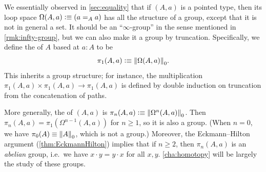 \begin{eg}\label{thm:homotopy-groups}
  We essentially observed in \cref{sec:equality} that if $(A,a)$ is a pointed type, then its loop space $\Omega(A,a)\defeq (\id[A]aa)$ has all the structure of a group, except that it is not in general a set.
  It should be an ``$\infty$-group'' in the sense mentioned in \cref{rmk:infty-group}, but we can also make it a group by truncation.
  Specifically, we define the 
  of $A$ based at $a:A$ to be
  \[\pi_1(A,a)\defeq \trunc0{\Omega(A,a)}.\]
  This inherits a group structure; for instance, the multiplication $\pi_1(A,a) \times \pi_1(A,a) \to \pi_1(A,a)$ is defined by double induction on truncation from the concatenation of paths.

  More generally, the 
  of $(A,a)$ is $\pi_n(A,a)\defeq \trunc0{\Omega^n(A,a)}$.
  Then $\pi_n(A,a) = \pi_1(\Omega^{n-1}(A,a))$ for $n\ge 1$, so it is also a group.
  (When $n=0$, we have $\pi_0(A) \jdeq \trunc0 A$, which is not a group.)
  Moreover, the Eckmann--Hilton argument  (\cref{thm:EckmannHilton}) implies that if $n\ge 2$, then $\pi_n(A,a)$ is an \emph{abelian} group, i.e.\ we have $x\cdot y = y\cdot x$ for all $x,y$.
  \cref{cha:homotopy} will be largely the study of these groups.
\end{eg}

